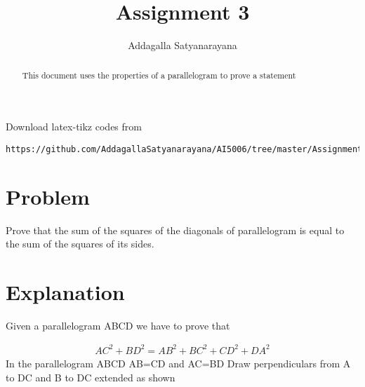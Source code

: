 \documentclass[journal,12pt,twocolumn]{IEEEtran}
\begin{document}
\renewcommand{\thefigure}{\theproblem}
\def\putbox#1#2#3{\makebox[0in][l]{\makebox[#1][l]{}\raisebox{\baselineskip}[0in][0in]{\raisebox{#2}[0in][0in]{#3}}}}
     \def\rightbox#1{\makebox[0in][r]{#1}}
     \def\centbox#1{\makebox[0in]{#1}}
     \def\topbox#1{\raisebox{-\baselineskip}[0in][0in]{#1}}
     \def\midbox#1{\raisebox{-0.5\baselineskip}[0in][0in]{#1}}
\vspace{3cm}
\title{Assignment 3}
\author{Addagalla Satyanarayana}
\maketitle
\newpage
\bigskip
\renewcommand{\thefigure}{\theenumi}
\renewcommand{\thetable}{\theenumi}
\begin{abstract}
This document uses the properties of a parallelogram to prove a statement
\end{abstract}
Download latex-tikz codes from 
%
\begin{lstlisting}
https://github.com/AddagallaSatyanarayana/AI5006/tree/master/Assignment3/assignment3.tex
\end{lstlisting}
%
\section{Problem}
Prove that the sum of the squares of the diagonals of parallelogram is equal to the sum of the squares of its sides.
\section{Explanation}
Given a parallelogram ABCD we have to prove that


\begin{align}
AC^2 + BD^2= AB^2  +BC^2+ CD^2+ DA^2
\end{align}
In the parallelogram ABCD AB=CD and AC=BD
Draw perpendiculars from A to DC and B to DC extended as shown
\end{document}
